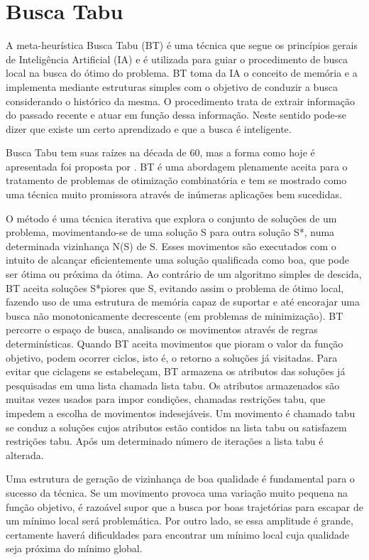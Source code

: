  
\section{Busca Tabu}
 
A meta-heurística Busca Tabu (BT) é uma técnica que segue os princípios gerais de Inteligência Artificial (IA) e é utilizada para guiar o procedimento de busca local na busca do ótimo do problema. BT toma da IA o conceito de memória e a implementa mediante estruturas simples com o objetivo de conduzir a busca considerando o histórico da mesma. O procedimento trata de extrair informação do passado recente e atuar em função dessa informação. Neste sentido pode-se dizer que existe um certo aprendizado e que a busca é inteligente. 


Busca Tabu tem suas raízes na década de 60, mas a forma como hoje é apresentada foi proposta por \cite{glover97}. BT é uma abordagem plenamente aceita para o tratamento de problemas de otimização combinatória e tem se mostrado como uma técnica muito promissora através de inúmeras aplicações bem sucedidas. 

O método é uma técnica iterativa que explora o conjunto de soluções de um problema, movimentando-se de uma solução S para outra solução S*, numa determinada vizinhança N(S) de S. Esses movimentos são executados com o intuito de alcançar eficientemente uma solução qualificada como boa, que pode ser ótima ou próxima da ótima. Ao contrário de um algoritmo simples de descida, BT aceita soluções S*piores que S, evitando assim o problema de ótimo local, fazendo uso de uma estrutura de memória capaz de suportar e até encorajar uma busca não monotonicamente decrescente (em problemas de minimização). BT percorre o espaço de busca, analisando os movimentos através de regras determinísticas. Quando BT aceita movimentos que pioram o valor da função objetivo, podem ocorrer ciclos, isto é, o retorno a soluções já visitadas. Para evitar que ciclagens se estabeleçam, BT armazena os atributos das soluções já pesquisadas em uma lista chamada lista tabu. Os atributos armazenados são muitas vezes usados para impor condições, chamadas restrições tabu, que impedem a escolha de movimentos indesejáveis. Um movimento é chamado tabu se conduz a soluções cujos atributos estão contidos na lista tabu ou satisfazem restrições tabu. Após um determinado número de iterações a lista tabu é alterada. 


Uma estrutura de geração de vizinhança de boa qualidade é fundamental para o sucesso da técnica. Se um movimento provoca uma variação muito pequena na função objetivo, é razoável supor que a busca por boas trajetórias para escapar de um mínimo local será problemática. Por outro lado, se essa amplitude é grande, certamente haverá dificuldades para encontrar um mínimo local cuja qualidade seja próxima do mínimo global. 


